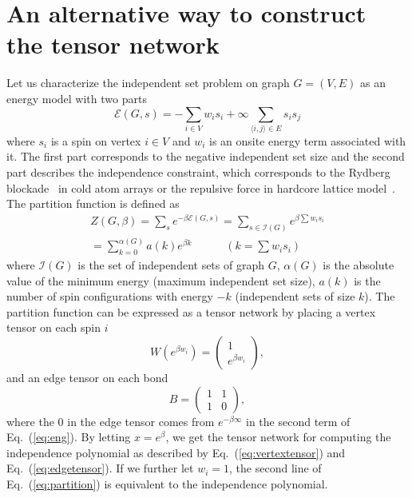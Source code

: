 \documentclass[onefignum, onetabnum]{siamart190516}
\newcommand{\<}{\langle}
\renewcommand{\>}{\rangle}
\newcommand{\Eq}[1]{Eq.~(\ref{#1})}
\begin{document}



\appendix

\section{An alternative way to construct the tensor network}\label{sec:energymodel}

Let us characterize the independent set problem on graph $G=(V, E)$ as an energy model with two parts
\begin{equation}\label{eq:eng}
    \mathcal{E}(G, s) = -\sum_{i\in V} w_i s_i + \infty \sum_{\langle i,j\rangle \in E}s_i s_j
\end{equation}
where $s_i$ is a spin on vertex $i \in V$ and $w_i$ is an onsite energy term associated with it.
The first part corresponds to the negative independent set size and the second part describes the independence constraint, which corresponds to the Rydberg blockade~\cite{Pichler2018, Ebadi2022} in cold atom arrays or the repulsive force in hardcore lattice model~\cite{Dyre2016, Fernandes2007}.
The partition function is defined as
\begin{equation}\label{eq:partition}
    \begin{split}
    Z(G, \beta) = \sum_{s}e^{-\beta \mathcal{E}(G, s)} = \sum_{s\in \mathcal{I}(G)} e^{\beta \sum w_i s_i}\\
         = \sum_{k=0}^{\alpha(G)}a(k) e^{\beta k}  \qquad \quad (k = \sum w_i s_i)
    \end{split}
\end{equation}
where $\mathcal{I}(G)$ is the set of independent sets of graph $G$, $\alpha(G)$ is the absolute value of the minimum energy (maximum independent set size), $a(k)$ is the number of spin configurations with energy $-k$ (independent sets of size $k$).
The partition function can be expressed as a tensor network by placing a vertex tensor on each spin $i$
\begin{equation}
    W(e^{\beta w_i}) = \left(\begin{matrix}
        1 \\
        e^{\beta w_i}
    \end{matrix}\right),
\end{equation}
and an edge tensor on each bond
\begin{equation}
       B = \left(\begin{matrix}
        1  & 1\\
        1 & 0
    \end{matrix}\right),
\end{equation}
where the $0$ in the edge tensor comes from $e^{-\beta\infty}$ in the second term of \Eq{eq:eng}.
By letting $x = e^{\beta}$, we get the tensor network for computing the independence polynomial as described by \Eq{eq:vertextensor} and \Eq{eq:edgetensor}.
If we further let $w_i=1$, the second line of \Eq{eq:partition} is equivalent to the independence polynomial.
\end{document}
